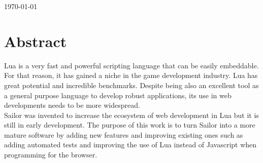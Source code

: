\documentclass{article}
\begin{document}
\begin{titlepage}


{\large \today}\\[3cm] %





 

\vfill %

\end{titlepage}




	\newpage
	\tableofcontents

	\newpage

	\section{Abstract}

Lua is a very fast and powerful scripting language that can be easily embeddable. For that reason, it has gained a niche in the game development industry. Lua has great potential and incredible benchmarks. Despite being also an excellent tool as a general purpose language to develop robust applications, its use in web developments needs to be more widespread. \\

Sailor was invented to increase the ecosystem of web development in Lua but it is still in early development. The purpose of this work is to turn Sailor into a more mature software by adding new features and improving existing ones such as adding automated tests and improving the use of Lua instead of Javascript when programming for the browser. 
\end{document}
